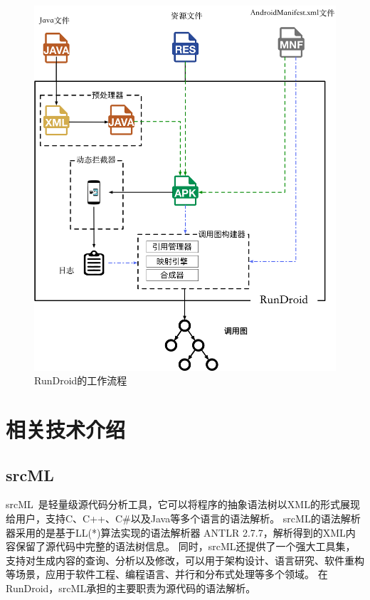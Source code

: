 \begin{figure}[h]
	\centering
	\includegraphics[height=0.5\textheight]{./Figures/rundroid-overview.png}
	\caption{ RunDroid的工作流程}
	\label{fig:rundroid_overview}
\end{figure}


\section{相关技术介绍}


\subsection{srcML}
srcML~\cite{collard2013srcml}是轻量级源代码分析工具，它可以将程序的抽象语法树以XML的形式展现给用户，支持C、C++、C\#以及Java等多个语言的语法解析。
srcML的语法解析器采用的是基于LL(*)算法实现的语法解析器 ANTLR 2.7.7，解析得到的XML内容保留了源代码中完整的语法树信息。
同时，srcML还提供了一个强大工具集，支持对生成内容的查询、分析以及修改，可以用于架构设计、语言研究、软件重构等场景，应用于软件工程、编程语言、并行和分布式处理等多个领域。
在RunDroid，srcML承担的主要职责为源代码的语法解析。



